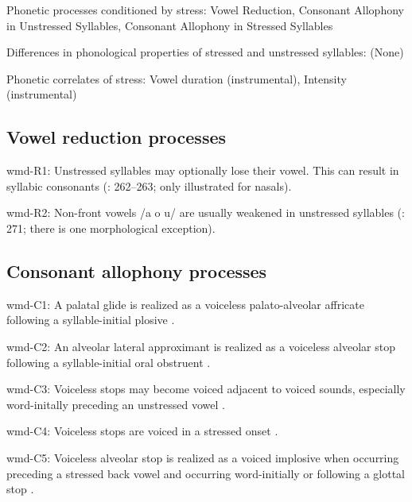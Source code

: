 {\begin{appendixdesc}
\item[Phonetic processes conditioned by stress:] Vowel Reduction, Consonant Allophony in Unstressed Syllables, Consonant Allophony in Stressed Syllables

\item[Differences in phonological properties of stressed and unstressed syllables:] (None)

\item[Phonetic correlates of stress:] Vowel duration (instrumental), Intensity (instrumental)
\end{appendixdesc}
\subsection*{Vowel reduction processes}
\begin{appendixdesc}

\item[wmd-R1:] Unstressed syllables may optionally lose their vowel. This can result in syllabic consonants (\citealt{Eberhard2009}: 262--263; only illustrated for nasals).

\item[wmd-R2:] Non-front vowels /a o u/ are usually weakened in unstressed syllables (\citealt{Eberhard2009}: 271; there is one morphological exception).
\end{appendixdesc}
\subsection*{Consonant allophony processes}
\begin{appendixdesc}

\item[wmd-C1:] A palatal glide is realized as a voiceless palato-alveolar affricate following a syllable-initial plosive \citep[94]{Eberhard2009}.

\item[wmd-C2:] An alveolar lateral approximant is realized as a voiceless alveolar stop following a syllable-initial oral obstruent \citep[92]{Eberhard2009}.

\item[wmd-C3:] Voiceless stops may become voiced adjacent to voiced sounds, especially word-initally preceding an unstressed vowel \citep{Eberhard2009}.

\item[wmd-C4:] Voiceless stops are voiced in a stressed onset \citep[55]{Eberhard2009}.

\item[wmd-C5:] Voiceless alveolar stop is realized as a voiced implosive when occurring preceding a stressed back vowel and occurring word-initially or following a glottal stop \citep[58]{Eberhard2009}.


\end{appendixdesc}}
